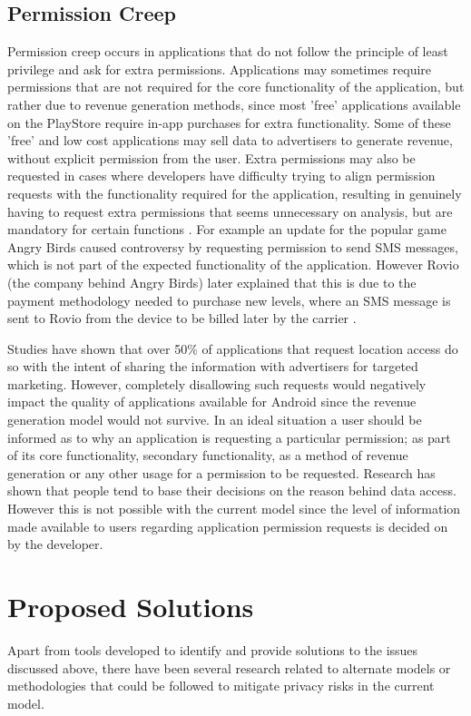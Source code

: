 \subsection{Permission Creep}
Permission creep occurs in applications that do not follow the principle of least privilege and ask for extra permissions\cite{vidas2011curbing}. Applications may sometimes require permissions that are not required for the core functionality of the application, but rather due to revenue generation methods, since most 'free' applications available on the PlayStore require in-app purchases for extra functionality. Some of these 'free' and low cost applications may sell data to advertisers to generate revenue, without explicit permission from the user. Extra permissions may also be requested in cases where developers have difficulty trying to align permission requests with the functionality required for the application, resulting in genuinely having to request extra permissions that seems unnecessary on analysis, but are mandatory for certain functions \cite{vidas2011curbing}. For example an update for the popular game Angry Birds caused controversy by requesting permission to send SMS messages, which is not part of the expected functionality of the application. However Rovio (the company behind Angry Birds) later explained that this is due to the payment methodology needed to purchase new levels, where an SMS message is sent to Rovio from the device to be billed later by the carrier \cite{w} \cite{u}. 
\smallskip

Studies have shown that over 50\% of applications that request location access do so with the intent of sharing the information with advertisers for targeted marketing\cite{saint201050}. However, completely disallowing such requests would negatively impact the quality of applications available for Android since the revenue generation model would not survive. \cite{aa} In an ideal situation a user should be informed as to why an application is requesting a particular permission; as part of its core functionality, secondary functionality, as a method of revenue generation or any other usage for a permission to be requested. Research has shown that people tend to base their decisions on the reason behind data access\cite{lin2014modeling}. However this is not possible with the current model since the level of information made available to users regarding application permission requests is decided on by the developer.

\section{Proposed Solutions}
Apart from tools developed to identify and provide solutions to the issues discussed above, there have been several research related to alternate models or methodologies that could be followed to mitigate privacy risks in the current model.

